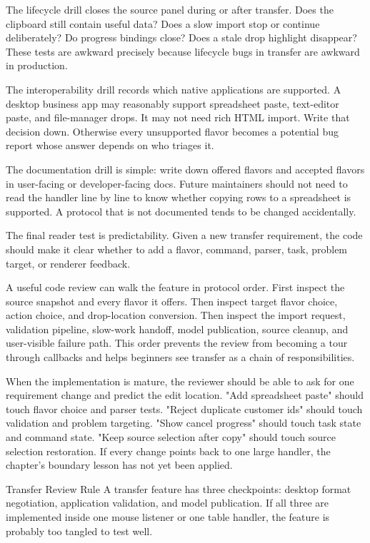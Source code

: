The lifecycle drill closes the source panel during or after transfer. Does the clipboard still contain useful data? Does a slow import stop or continue deliberately? Do progress bindings close? Does a stale drop highlight disappear? These tests are awkward precisely because lifecycle bugs in transfer are awkward in production.

The interoperability drill records which native applications are supported. A desktop business app may reasonably support spreadsheet paste, text-editor paste, and file-manager drops. It may not need rich HTML import. Write that decision down. Otherwise every unsupported flavor becomes a potential bug report whose answer depends on who triages it.

The documentation drill is simple: write down offered flavors and accepted flavors in user-facing or developer-facing docs. Future maintainers should not need to read the handler line by line to know whether copying rows to a spreadsheet is supported. A protocol that is not documented tends to be changed accidentally.

The final reader test is predictability. Given a new transfer requirement, the code should make it clear whether to add a flavor, command, parser, task, problem target, or renderer feedback.

A useful code review can walk the feature in protocol order. First inspect the source snapshot and every flavor it offers. Then inspect target flavor choice, action choice, and drop-location conversion. Then inspect the import request, validation pipeline, slow-work handoff, model publication, source cleanup, and user-visible failure path. This order prevents the review from becoming a tour through callbacks and helps beginners see transfer as a chain of responsibilities.

When the implementation is mature, the reviewer should be able to ask for one requirement change and predict the edit location. "Add spreadsheet paste" should touch flavor choice and parser tests. "Reject duplicate customer ids" should touch validation and problem targeting. "Show cancel progress" should touch task state and command state. "Keep source selection after copy" should touch source selection restoration. If every change points back to one large handler, the chapter's boundary lesson has not yet been applied.

\begin{detailbox}{Transfer Review Rule}
A transfer feature has three checkpoints: desktop format negotiation, application validation, and model publication. If all three are implemented inside one mouse listener or one table handler, the feature is probably too tangled to test well.
\end{detailbox}

